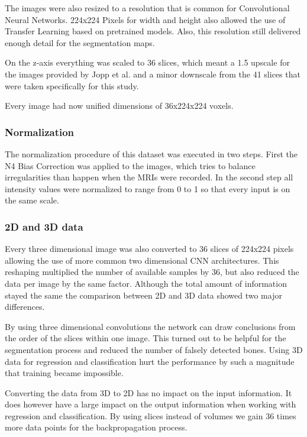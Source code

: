 The images were also resized to a resolution that is common for Convolutional Neural Networks. 224x224 Pixels for width and height also allowed the use of Transfer Learning based on pretrained models. Also, this resolution still delivered enough detail for the segmentation maps.

On the z-axis everything was scaled to 36 slices, which meant a 1.5 upscale for the images provided by Jopp et al. and a minor downscale from the 41 slices that were taken specifically for this study.

Every image had now unified dimensions of 36x224x224 voxels.

\subsubsection{Normalization}

The normalization procedure of this dataset was executed in two steps. First the N4 Bias Correction was applied to the images, which tries to balance irregularities than happen when the MRIs were recorded. In the second step all intensity values were normalized to range from 0 to 1 so that every input is on the same scale.

\subsubsection{2D and 3D data}

Every three dimensional image was also converted to 36 slices of 224x224 pixels allowing the use of more common two dimensional CNN architectures. This reshaping multiplied the number of available samples by 36, but also reduced the data per image by the same factor. Although the total amount of information stayed the same the comparison between 2D and 3D data showed two major differences.

By using three dimensional convolutions the network can draw conclusions from the order of the slices within one image. This turned out to be helpful for the segmentation process and reduced the number of falsely detected bones. Using 3D data for regression and classification hurt the performance by such a magnitude that training became impossible. 

Converting the data from 3D to 2D has no impact on the input information. It does however have a large impact on the output information when working with regression and classification. By using slices instead of volumes we gain 36 times more data points for the backpropagation process.



